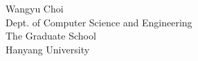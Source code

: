 \documentclass[a4paper,12pt]{HYU}
\begin{document}
\begin{flushleft}
\hspace{6.4cm} {\fontsize{11pt}{16} \selectfont Wangyu Choi}\\
\hspace{6.4cm} {\fontsize{11pt}{16} \selectfont Dept. of Computer Science and Engineering} \\
\hspace{6.4cm} {\fontsize{11pt}{16} \selectfont The Graduate School}\\
\hspace{6.4cm} {\fontsize{11pt}{16} \selectfont Hanyang University}
\end{flushleft}


\mainmatter








\makebibliography
\restoregeometry

\abstractinkorea




\acknowledgments


\end{document}
